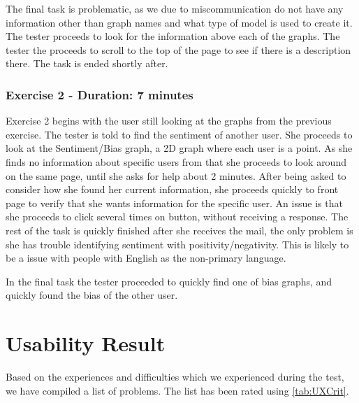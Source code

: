 The final task is problematic, as we due to miscommunication do not have any
information other than graph names and what type of model is used to create it.
The tester proceeds to look for the information above each of the graphs. The
tester the proceeds to scroll to the top of the page to see if there is a
description there. The task is ended shortly after.

\subsubsection{Exercise 2 - Duration: 7 minutes}
Exercise 2 begins with the user still looking at the graphs from the previous
exercise. The tester is told to find the sentiment of another user. She proceeds
to look at the Sentiment/Bias graph, a 2D graph where each user is a point. As
she finds no information about specific users from that she proceeds to look
around on the same page, until she asks for help about 2 minutes. After being
asked to consider how she found her current information, she proceeds quickly to
front page to verify that she wants information for the specific user. An issue
is that she proceeds to click several times on button, without receiving a
response. The rest of the task is quickly finished after she receives the mail,
the only problem is she has trouble identifying sentiment with
positivity/negativity. This is likely to be a issue with people with English as
the non-primary language.\nl

In the final task the tester proceeded to quickly find one of bias graphs, and
quickly found the bias of the other user.

\section{Usability Result}\label{sec:UXUR}
Based on the experiences and difficulties which we experienced during the test,
we have compiled a list of problems. The list has been rated using
\autoref{tab:UXCrit}.

